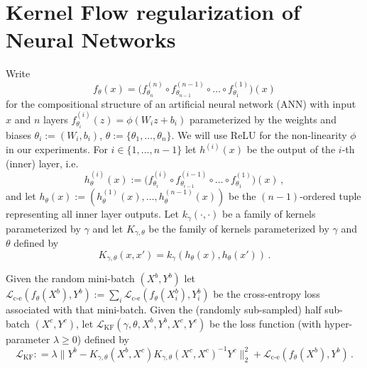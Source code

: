 \documentclass[11pt]{article}
\def\L{\mathcal{L}}
\begin{document}
\section{Kernel Flow regularization of Neural Networks}\label{KF reg}
Write
\begin{equation}
    f_\theta(x) = \big(f^{(n)}_{\theta_n}\circ f^{(n-1)}_{\theta_{n-1}} \circ \dots \circ f^{(1)}_{\theta_1}\big)(x)
\end{equation}
for the compositional structure of an artificial neural network (ANN) with input $x$ and $n$ layers
$ f^{(i)}_{\theta_i}(z) = \phi(W_i z + b_i)$ parameterized by the weights and biases $\theta_i:=(W_i,b_i)$, $\theta := \{\theta_1, \dots, \theta_n\}$. We will use ReLU for the  non-linearity $\phi$ in our experiments.
For  $i\in\{1, \dots, n-1\}$ let $ h^{(i)}(x)$ be the output of the $i$-th (inner)  layer, i.e.
\begin{equation}
    h_\theta^{(i)}(x) := \big(f^{(i)}_{\theta_i}\circ f^{(i-1)}_{\theta_{i-1}} \circ \dots \circ f^{(1)}_{\theta_1}\big)(x) \, ,
\end{equation}
 and let  $h_\theta(x) := (h_\theta^{(1)}(x), \dots, h_\theta^{(n-1)}(x))$ be the $(n-1)$-ordered tuple representing all inner layer outputs.
Let $k_{\gamma}(\cdot, \cdot)$  be a family of kernels parameterized by $\gamma$ and let $K_{\gamma,\theta}$ be the family of kernels parameterized by $\gamma$ and $\theta$ defined by
\begin{equation}\label{eqgjyguyuyb}
    K_{\gamma,\theta}(x, x') = k_{\gamma}(h_\theta(x), h_\theta(x'))\, .
\end{equation}

Given the random mini-batch $(X^b,Y^b)$ let  $\L_\text{c-e}(f_\theta(X^b), Y^b):=\sum_i \L_\text{c-e}(f_\theta(X^b_i), Y^b_i)$ be the cross-entropy loss associated with that mini-batch. Given the (randomly sub-sampled) half sub-batch $(X^c,Y^c)$,
 let $ \L_\text{KF}(\gamma,\theta,X^b,Y^b, X^c,Y^c)$ be the loss function (with   hyper-parameter $\lambda\geq 0$) defined by
\begin{equation}\label{KFloss}
    \L_\text{KF}: = \lambda \|Y^b - K_{\gamma,\theta}(X^b,X^c) K_{\gamma,\theta}(X^c,X^c)^{-1} Y^c\|_2^2
     +  \L_\text{c-e}(f_\theta(X^b), Y^b)\,.
\end{equation}
\end{document}
